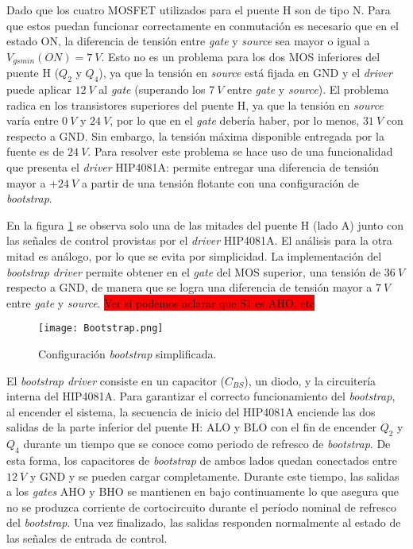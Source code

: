 Dado que los cuatro MOSFET utilizados para el puente H son de tipo N. Para que estos puedan funcionar correctamente en conmutación es necesario que en el estado ON, la diferencia de tensión entre \textsl{gate} y \textsl{source} sea mayor o igual a $V_{gs min}(ON) = 7\:V$. Esto no es un problema para los dos MOS inferiores del puente H ($Q_2$ y $Q_4$), ya que la tensión en \textsl{source} está fijada en GND y el \textsl{driver} puede aplicar $12\:V$ al \textsl{gate} (superando los $7\:V$ entre \textsl{gate} y \textsl{source}). El problema radica en los transistores superiores del puente H, ya que la tensión en \textsl{source} varía entre $0\:V$ y $24\:V$, por lo que en el \textsl{gate} debería haber, por lo menos, $31\:V$ con respecto a GND. Sin embargo, la tensión máxima disponible entregada por la fuente es de $24\:V$. Para resolver este problema se hace uso de una funcionalidad que presenta el \textsl{driver} HIP4081A: permite entregar una diferencia de tensión mayor a $+24\:V$ a partir de una tensión flotante con una configuración de \textsl{bootstrap}.

En la figura \ref{fig:img_bootstrap} se observa solo una de las mitades del puente H (lado A) junto con las señales de control provistas por el \textsl{driver} HIP4081A.  El análisis para la otra mitad es análogo, por lo que se evita por simplicidad. La implementación del \textsl{bootstrap driver} permite obtener en el \textsl{gate} del MOS superior, una tensión de $36\:V$ respecto a GND, de manera que se logra una diferencia de tensión mayor a $7\:V$ entre \textsl{gate} y \textsl{source}. 
\colorbox{red}{Ver si podemos aclarar que S1 es AHO, etc}
\begin{figure}[H]
	\centering
	\texttt{[image: Bootstrap.png]}
	\caption{Configuración \textsl{bootstrap} simplificada.}
	\label{fig:img_bootstrap}
\end{figure}

El \textsl{bootstrap driver} consiste en un capacitor ($C_{BS}$), un diodo, y la circuitería interna del HIP4081A. Para garantizar el correcto funcionamiento del \textsl{bootstrap}, al encender el sistema, la secuencia de inicio del HIP4081A enciende las dos salidas de la parte inferior del puente H: ALO y BLO con el fin de encender $Q_2$ y $Q_4$ durante un tiempo que se conoce como periodo de refresco de \textsl{bootstrap}. De esta forma, los capacitores de \textsl{bootstrap} de ambos lados quedan conectados entre $12\:V$ y GND y se pueden cargar completamente. Durante este tiempo, las salidas a los \textsl{gates} AHO y BHO se mantienen en bajo continuamente lo que asegura que no se produzca corriente de cortocircuito durante el período nominal de refresco del \textsl{bootstrap}. Una vez finalizado, las salidas responden normalmente al estado de las señales de entrada de control.

